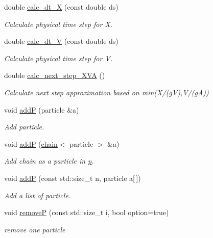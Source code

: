 \begin{DoxyCompactItemize}
double \hyperlink{classARC_1_1chain_add21c686f37a3c0a7229bdce83015c61}{calc\+\_\+dt\+\_\+X} (const double ds)
\begin{DoxyCompactList}\small\item\em Calculate physical time step for X. \end{DoxyCompactList}\item 
double \hyperlink{classARC_1_1chain_ad4bd36fa9cc967d0d32c3a5ca8074fa0}{calc\+\_\+dt\+\_\+V} (const double ds)
\begin{DoxyCompactList}\small\item\em Calculate physical time step for V. \end{DoxyCompactList}\item 
double \hyperlink{classARC_1_1chain_a3d0f80ad6952b0e38762465092ed86a6}{calc\+\_\+next\+\_\+step\+\_\+\+X\+VA} ()
\begin{DoxyCompactList}\small\item\em Calculate next step approximation based on min(X/(gV),V/(gA)) \end{DoxyCompactList}\item 
void \hyperlink{classARC_1_1chain_a0f91c399beb1e5c0db6ed7e2b4d00477}{addP} (particle \&a)
\begin{DoxyCompactList}\small\item\em Add particle. \end{DoxyCompactList}\item 
void \hyperlink{classARC_1_1chain_a22a0c3e8b42954edee0d2f66a27e8640}{addP} (\hyperlink{classARC_1_1chain}{chain}$<$ particle $>$ \&a)
\begin{DoxyCompactList}\small\item\em Add chain as a particle in \hyperlink{classARC_1_1chain_af1793b656e139e1f87c2e0a55f87514b}{p}. \end{DoxyCompactList}\item 
void \hyperlink{classARC_1_1chain_a658a7b777ac45e7900990dcc6ef0b752}{addP} (const std\+::size\+\_\+t n, particle a\mbox{[}$\,$\mbox{]})
\begin{DoxyCompactList}\small\item\em Add a list of particle. \end{DoxyCompactList}\item 
void \hyperlink{classARC_1_1chain_a6c622f6f09a11f81a72e26de0c8cbfc8}{removeP} (const std\+::size\+\_\+t i, bool option=true)
\begin{DoxyCompactList}\small\item\em remove one particle \end{DoxyCompactList}\item 

\end{DoxyCompactItemize}
